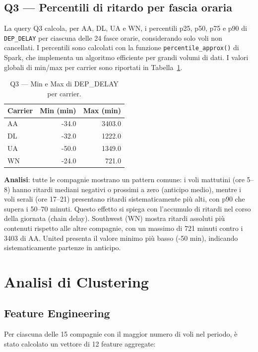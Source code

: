 \documentclass[sigconf]{acmart}
\begin{document}
\subsection{Q3 — Percentili di ritardo per fascia oraria}

La query Q3 calcola, per AA, DL, UA e WN, i percentili p25, p50, p75 e p90 di
\texttt{DEP\_DELAY} per ciascuna delle 24 fasce orarie, considerando solo voli
non cancellati. I percentili sono calcolati con la funzione
\texttt{percentile\_approx()} di Spark, che implementa un algoritmo efficiente
per grandi volumi di dati. I valori globali di min/max per carrier sono
riportati in Tabella~\ref{tab:q3range}.

\begin{table}[h]
\caption{Q3 — Min e Max di DEP\_DELAY per carrier.}
\label{tab:q3range}
\begin{tabular}{lrr}
\toprule
Carrier & Min (min) & Max (min) \\
\midrule
AA & -34.0 & 3403.0 \\
DL & -32.0 & 1222.0 \\
UA & -50.0 & 1349.0 \\
WN & -24.0 &  721.0 \\
\bottomrule
\end{tabular}
\end{table}

\textbf{Analisi}: tutte le compagnie mostrano un pattern comune: i voli
mattutini (ore 5--8) hanno ritardi mediani negativi o prossimi a zero (anticipo
medio), mentre i voli serali (ore 17--21) presentano ritardi sistematicamente
più alti, con p90 che supera i 50--70 minuti. Questo effetto si spiega con
l'accumulo di ritardi nel corso della giornata (chain delay). Southwest (WN)
mostra ritardi assoluti più contenuti rispetto alle altre compagnie, con un
massimo di 721 minuti contro i 3403 di AA. United presenta il valore minimo
più basso (-50 min), indicando sistematicamente partenze in anticipo.

\section{Analisi di Clustering}

\subsection{Feature Engineering}

Per ciascuna delle 15 compagnie con il maggior numero di voli nel periodo, è
stato calcolato un vettore di 12 feature aggregate:
\end{document}
